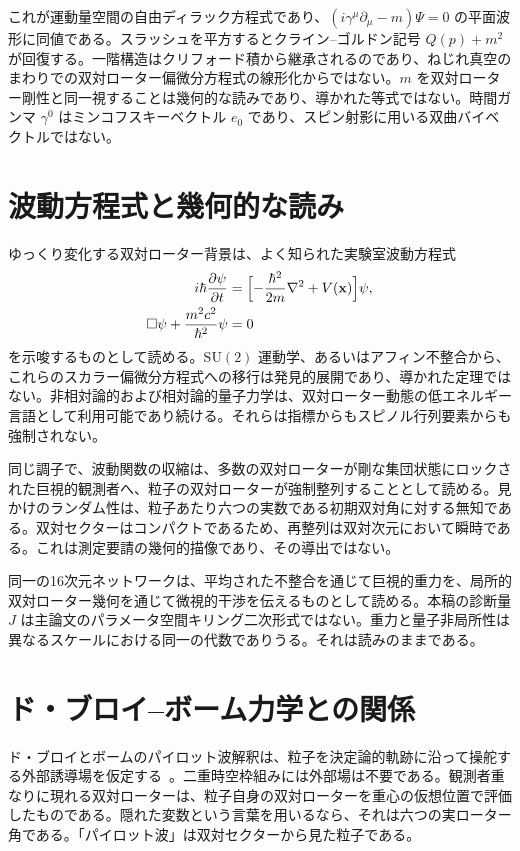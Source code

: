 \documentclass[a4paper]{article}
\begin{document}
これが運動量空間の自由ディラック方程式であり、\((i\gamma^{\mu}\partial_{\mu}-m)\Psi=0\) の平面波形に同値である。スラッシュを平方するとクライン–ゴルドン記号 \(Q(p)+m^2\) が回復する。一階構造はクリフォード積から継承されるのであり、ねじれ真空のまわりでの双対ローター偏微分方程式の線形化からではない。\(m\) を双対ローター剛性と同一視することは幾何的な読みであり、導かれた等式ではない。時間ガンマ \(\gamma^0\) はミンコフスキーベクトル \(e_0\) であり、スピン射影に用いる双曲バイベクトルではない。

\section{波動方程式と幾何的な読み}

ゆっくり変化する双対ローター背景は、よく知られた実験室波動方程式
\begin{align}
i\hbar\frac{\partial\psi}{\partial t}
  &=\Bigl[-\frac{\hbar^2}{2m}\nabla^2+V(\mathbf{x})\Bigr]\psi, \\
\square\psi+\frac{m^2c^2}{\hbar^2}\psi&=0
\end{align}
を示唆するものとして読める。\(\mathrm{SU}(2)\) 運動学、あるいはアフィン不整合から、これらのスカラー偏微分方程式への移行は発見的展開であり、導かれた定理ではない。非相対論的および相対論的量子力学は、双対ローター動態の低エネルギー言語として利用可能であり続ける。それらは指標からもスピノル行列要素からも強制されない。

同じ調子で、波動関数の収縮は、多数の双対ローターが剛な集団状態にロックされた巨視的観測者へ、粒子の双対ローターが強制整列することとして読める。見かけのランダム性は、粒子あたり六つの実数である初期双対角に対する無知である。双対セクターはコンパクトであるため、再整列は双対次元において瞬時である。これは測定要請の幾何的描像であり、その導出ではない。

同一の16次元ネットワークは、平均された不整合を通じて巨視的重力を、局所的双対ローター幾何を通じて微視的干渉を伝えるものとして読める。本稿の診断量 \(J\) は主論文のパラメータ空間キリング二次形式ではない。重力と量子非局所性は異なるスケールにおける同一の代数でありうる。それは読みのままである。

\section{ド・ブロイ–ボーム力学との関係}

ド・ブロイとボームのパイロット波解釈は、粒子を決定論的軌跡に沿って操舵する外部誘導場を仮定する~\cite{bohm1952}。二重時空枠組みには外部場は不要である。観測者重なりに現れる双対ローターは、粒子自身の双対ローターを重心の仮想位置で評価したものである。隠れた変数という言葉を用いるなら、それは六つの実ローター角である。「パイロット波」は双対セクターから見た粒子である。
\end{document}
